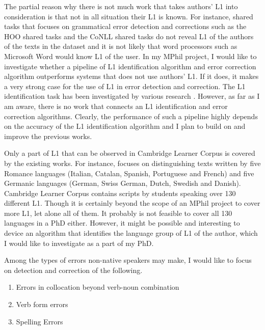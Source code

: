 \documentclass[11pt]{article}
\begin{document}
The partial reason why there is not much work that takes authors' L1 into consideration is that not in all situation their L1 is known. For instance, shared tasks that focuses on grammatical error detection and corrections such as the HOO shared tasks and the CoNLL shared tasks do not reveal L1 of the authors of the texts in the dataset and it is not likely that word processors such as Microsoft Word would know L1 of the user. In my MPhil project, I would like to investigate whether a pipeline of L1 identification algorithm and error correction algorithm outperforms systems that does not use authors' L1. If it does, it makes a very strong case for the use of L1 in error detection and correction. The L1 identification task has been investigated by various research \citep{estival2007author, tomokiyo2001you, koppel2005determining, koppel2005automatically, wong2009contrastive, kochmar2011identification}. However, as far as I am aware, there is no work that connects an L1 identification and error correction algorithms. Clearly, the performance of such a pipeline highly depends on the accuracy of the L1 identification algorithm and I plan to build on and improve the previous works.

Only a part of L1 that can be observed in Cambridge Learner Corpus is covered by the existing works. For instance, \cite{kochmar2011identification} focuses on distinguishing texts written by five Romance languages (Italian, Catalan, Spanish, Portuguese and French) and five Germanic languages (German, Swiss German, Dutch, Swedish and Danish). Cambridge Learner Corpus contains scripts by students speaking over 130 different L1. Though it is certainly beyond the scope of an MPhil project to cover more L1, let alone all of them. It probably is not feasible to cover all 130 languages in a PhD either. However, it might be possible and interesting to device an algorithm that identifies the language group of L1 of the author, which I would like to investigate as a part of my PhD.

Among the types of errors non-native speakers may make, I would like to focus on detection and correction of the following.
\begin{enumerate}
\item Errors in collocation beyond verb-noun combination \label{error:1}
\item Verb form errors \label{error:2}
\item Spelling Errors \label{error:3}
\end{enumerate}
\end{document}
